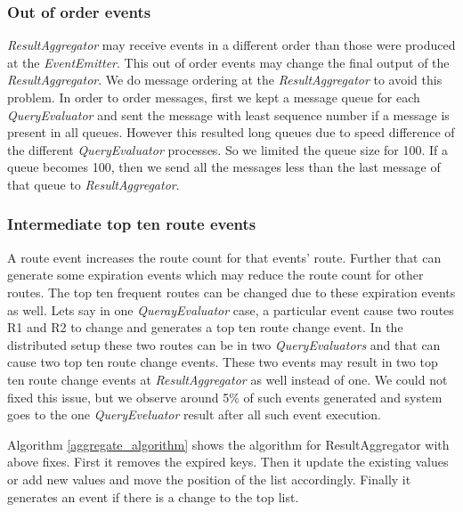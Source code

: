 \subsubsection{Out of order events}
\textit{ResultAggregator} may receive events in a different order than those were produced at the \textit{EventEmitter}. This out of order events may change the final output of the \textit{ResultAggregator}. We do message ordering at the \textit{ResultAggregator} to avoid this problem. In order to order messages, first we kept a message queue for each \textit{QueryEvaluator} and sent the message with least sequence number if a message is present in all queues.  However this resulted long queues due to speed difference of the different \textit{QueryEvaluator} processes. So we limited the queue size for 100. If a queue becomes 100, then we send all the messages less than the last message of that queue to \textit{ResultAggregator}.
\subsubsection{Intermediate top ten route events}
A route event increases the route count for that events' route. Further that can generate some expiration events which may reduce the route count for other routes. The top ten frequent routes can be changed due to these expiration events as well. Lets say in one \textit{QuerayEvaluator} case, a particular event cause two routes R1 and R2 to change and generates a top ten route change event. In the distributed setup these two routes can be in two \textit{QueryEvaluators} and that can cause two top ten route change events. These two events may result in two top ten route change events at \textit{ResultAggregator} as well instead of one. We could not fixed this issue, but we observe around 5\% of such events generated and system goes to the one \textit{QueryEveluator} result after all such event execution.


Algorithm \ref{aggregate_algorithm} shows the algorithm for ResultAggregator with above fixes. First it removes the expired keys. Then it update the existing values or add new values and move the position of the list accordingly. Finally it generates an event if there is a change to the top list.


